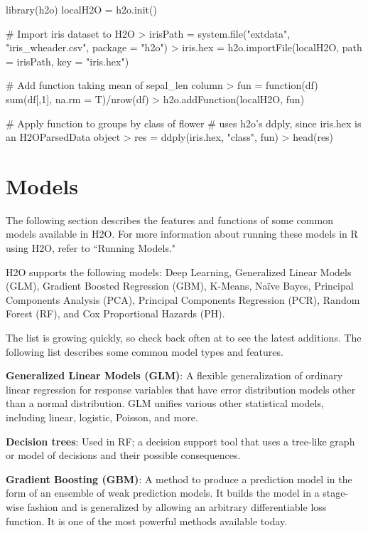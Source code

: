 \documentclass[11pt]{article}
\begin{document}
{\begin{spverbatim}
library(h2o)
localH2O = h2o.init()

# Import iris dataset to H2O
> irisPath = system.file("extdata", "iris_wheader.csv", package = "h2o")
> iris.hex = h2o.importFile(localH2O, path = irisPath, key = "iris.hex")

# Add function taking mean of sepal_len column
> fun = function(df) { sum(df[,1], na.rm = T)/nrow(df) }
> h2o.addFunction(localH2O, fun)

# Apply function to groups by class of flower
# uses h2o's ddply, since iris.hex is an H2OParsedData object
> res = ddply(iris.hex, "class", fun)
> head(res)
\end{spverbatim}

\section{Models}

The following section describes the features and functions of some common models available in H2O.  For more information about running these models in R using H2O, refer to ``Running Models." 

H2O supports the following models: Deep Learning, Generalized Linear Models (GLM), Gradient Boosted Regression (GBM), K-Means, Na\"{i}ve Bayes, Principal Components Analysis (PCA), Principal Components Regression (PCR), Random Forest (RF), and Cox Proportional Hazards (PH). 

The list is growing quickly, so check back often at  to see the latest additions. The following list describes some common model types and features. 

{\textbf{Generalized Linear Models (GLM)}}: A flexible generalization of ordinary linear regression for response variables that have error distribution models other than a normal distribution. GLM unifies various other statistical models, including linear, logistic, Poisson, and more.

{\textbf{Decision trees}}: Used in RF; a decision support tool that uses a tree-like graph or model of decisions and their possible consequences.

{\textbf{Gradient Boosting (GBM)}}: A method to produce a prediction model in the form of an ensemble of weak prediction models. It builds the model in a stage-wise fashion and is generalized by allowing an arbitrary differentiable loss function. It is one of the most powerful methods available today.

}
\end{document}
